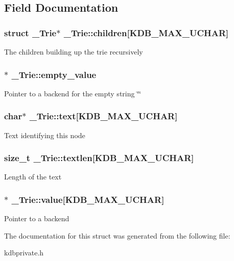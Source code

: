 \subsection{Field Documentation}
\hypertarget{struct__Trie_a75a95fbbe3775dee9270ad85bfe8e407}{
\subsubsection[{children}]{\setlength{\rightskip}{0pt plus 5cm}struct {\bf \_\-Trie}$\ast$ {\bf \_\-Trie::children}\mbox{[}KDB\_\-MAX\_\-UCHAR\mbox{]}}}
\label{struct__Trie_a75a95fbbe3775dee9270ad85bfe8e407}
The children building up the trie recursively \hypertarget{struct__Trie_ac5c6b4bddcccb23eb0bd26ffade7eb43}{
\subsubsection[{empty\_\-value}]{$\ast$ {\bf \_\-Trie::empty\_\-value}}}
\label{struct__Trie_ac5c6b4bddcccb23eb0bd26ffade7eb43}
Pointer to a backend for the empty string \char`\"{}\char`\"{} \hypertarget{struct__Trie_ad3ba18c413ba4fd9e91e3ff9b4ce8fcf}{
\subsubsection[{text}]{\setlength{\rightskip}{0pt plus 5cm}char$\ast$ {\bf \_\-Trie::text}\mbox{[}KDB\_\-MAX\_\-UCHAR\mbox{]}}}
\label{struct__Trie_ad3ba18c413ba4fd9e91e3ff9b4ce8fcf}
Text identifying this node \hypertarget{struct__Trie_a619b7bda11987e2e615d63ea06d41d4c}{
\subsubsection[{textlen}]{\setlength{\rightskip}{0pt plus 5cm}size\_\-t {\bf \_\-Trie::textlen}\mbox{[}KDB\_\-MAX\_\-UCHAR\mbox{]}}}
\label{struct__Trie_a619b7bda11987e2e615d63ea06d41d4c}
Length of the text \hypertarget{struct__Trie_a59000b73324788bb15eb659ceb76bd75}{
\subsubsection[{value}]{$\ast$ {\bf \_\-Trie::value}\mbox{[}KDB\_\-MAX\_\-UCHAR\mbox{]}}}
\label{struct__Trie_a59000b73324788bb15eb659ceb76bd75}
Pointer to a backend 

The documentation for this struct was generated from the following file:\begin{DoxyCompactItemize}
\item 
kdbprivate.h\end{DoxyCompactItemize}
